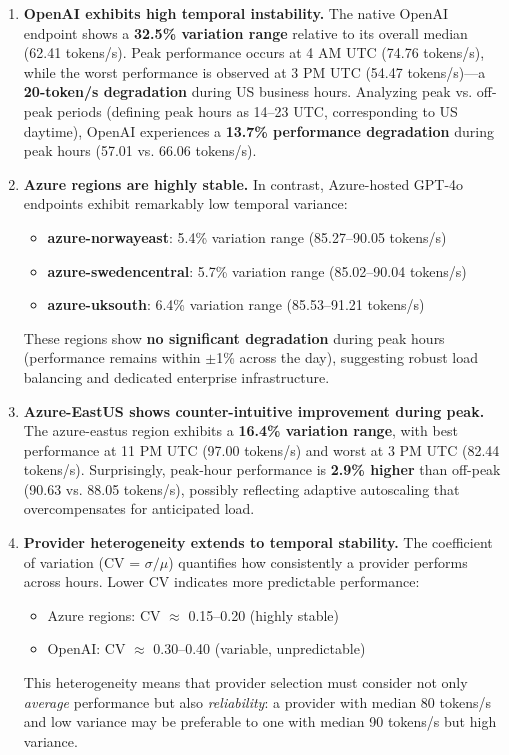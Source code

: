 \documentclass[english]{article}
\begin{document}
\begin{enumerate}
\item \textbf{OpenAI exhibits high temporal instability.} The native OpenAI endpoint shows a \textbf{32.5\% variation range} relative to its overall median (62.41 tokens/s). Peak performance occurs at 4 AM UTC (74.76 tokens/s), while the worst performance is observed at 3 PM UTC (54.47 tokens/s)—a \textbf{20-token/s degradation} during US business hours. Analyzing peak vs. off-peak periods (defining peak hours as 14--23 UTC, corresponding to US daytime), OpenAI experiences a \textbf{13.7\% performance degradation} during peak hours (57.01 vs. 66.06 tokens/s).

\item \textbf{Azure regions are highly stable.} In contrast, Azure-hosted GPT-4o endpoints exhibit remarkably low temporal variance:
\begin{itemize}
    \item \textbf{azure-norwayeast}: 5.4\% variation range (85.27--90.05 tokens/s)
    \item \textbf{azure-swedencentral}: 5.7\% variation range (85.02--90.04 tokens/s)
    \item \textbf{azure-uksouth}: 6.4\% variation range (85.53--91.21 tokens/s)
\end{itemize}
These regions show \textbf{no significant degradation} during peak hours (performance remains within $\pm$1\% across the day), suggesting robust load balancing and dedicated enterprise infrastructure.

\item \textbf{Azure-EastUS shows counter-intuitive improvement during peak.} The azure-eastus region exhibits a \textbf{16.4\% variation range}, with best performance at 11 PM UTC (97.00 tokens/s) and worst at 3 PM UTC (82.44 tokens/s). Surprisingly, peak-hour performance is \textbf{2.9\% higher} than off-peak (90.63 vs. 88.05 tokens/s), possibly reflecting adaptive autoscaling that overcompensates for anticipated load.

\item \textbf{Provider heterogeneity extends to temporal stability.} The coefficient of variation (CV = $\sigma/\mu$) quantifies how consistently a provider performs across hours. Lower CV indicates more predictable performance:
\begin{itemize}
    \item Azure regions: CV $\approx$ 0.15--0.20 (highly stable)
    \item OpenAI: CV $\approx$ 0.30--0.40 (variable, unpredictable)
\end{itemize}
This heterogeneity means that provider selection must consider not only \emph{average} performance but also \emph{reliability}: a provider with median 80 tokens/s and low variance may be preferable to one with median 90 tokens/s but high variance.
\end{enumerate}
\end{document}
